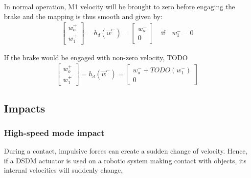 
In normal operation, M1 velocity will be brought to zero before engaging the brake and the mapping is thus smooth and given by:
%
\begin{align} 
\left[
\begin{array}{c}
w_o^+ \\ w_1^+
\end{array}
\right]
 = h_d( \vec{w}^- ) = 
\left[
\begin{array}{c}
w_o^- \\ 0
\end{array}
\right] \quad \text{if} \quad w_1^-=0
\label{eq:downshiftmap_ideal}
\end{align}


%
If the brake would be engaged with non-zero velocity, TODO
\begin{align} 
\left[
\begin{array}{c}
w_o^+ \\ w_1^+
\end{array}
\right]
 = h_d( \vec{w}^- ) = 
\left[
\begin{array}{c}
w_o^- + TODO(w_1^-) \\ 0
\end{array}
\right]
\label{eq:downshiftmap_ideal}
\end{align}




\subsection{Impacts}
\label{sec:model_impact}

\subsubsection{High-speed mode impact}

During a contact, impulsive forces can create a sudden change of velocity. Hence, if a DSDM actuator is used on a robotic system making contact with objects, its internal velocities will suddenly change, 


